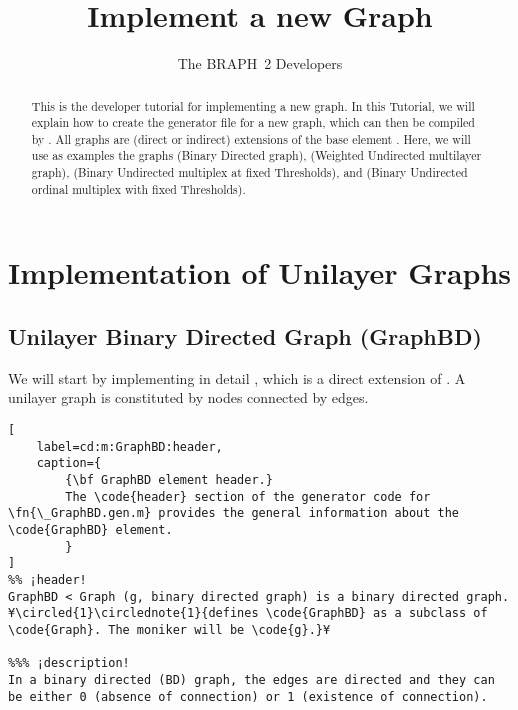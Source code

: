\documentclass{tufte-handout}
\title{Implement a new Graph}
\author[The BRAPH~2 Developers]{The BRAPH~2 Developers}
\begin{document}
\maketitle

\begin{abstract}
\noindent
This is the developer tutorial for implementing a new graph. 
In this Tutorial, we will explain how to create the generator file  for a new graph, which can then be compiled by . All graphs are (direct or indirect) extensions of the base element . Here, we will use as examples the graphs  (Binary Directed graph),  (Weighted Undirected multilayer graph),  (Binary Undirected multiplex at fixed Thresholds), and  (Binary Undirected ordinal multiplex with fixed Thresholds).
\end{abstract}

\tableofcontents

\clearpage
\section{Implementation of Unilayer Graphs}

\subsection{Unilayer Binary Directed Graph (GraphBD)}

We will start by implementing in detail , which  is a direct extension of  .
A unilayer graph is constituted by nodes connected by edges.

\begin{lstlisting}[
	label=cd:m:GraphBD:header,
	caption={
		{\bf GraphBD element header.}
		The \code{header} section of the generator code for \fn{\_GraphBD.gen.m} provides the general information about the \code{GraphBD} element.
		}
]
%% ¡header!
GraphBD < Graph (g, binary directed graph) is a binary directed graph. ¥\circled{1}\circlednote{1}{defines \code{GraphBD} as a subclass of \code{Graph}. The moniker will be \code{g}.}¥

%%% ¡description!
In a binary directed (BD) graph, the edges are directed and they can be either 0 (absence of connection) or 1 (existence of connection).
\end{lstlisting}
\end{document}
